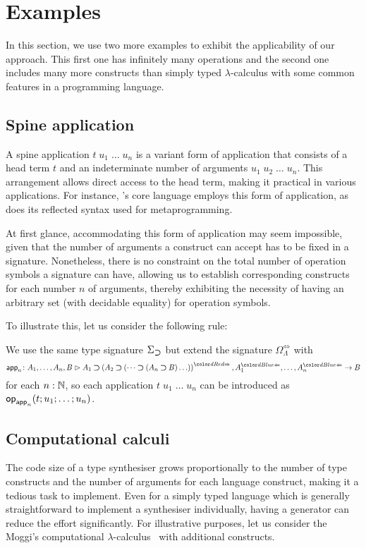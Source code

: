 
\section{Examples}\label{sec:example}
In this section, we use two more examples to exhibit the applicability of our approach.
This first one has infinitely many operations and the second one includes many more constructs than simply typed $\lambda$-calculus with some common features in a programming language.

\subsection{Spine application}\label{subsec:spine}
A spine application $t\;u_1\;\ldots\;u_n$ is a variant form of application that consists of a head term $t$ and an indeterminate number of arguments $u_1\;u_2\;\dots\;u_n$.
This arrangement allows direct access to the head term, making it practical in various applications.
For instance, \Agda's core language employs this form of application, as does its reflected syntax used for metaprogramming.

At first glance, accommodating this form of application may seem impossible, given that the number of arguments a construct can accept has to be fixed in a signature.
Nonetheless, there is no constraint on the total number of operation symbols a signature can have, allowing us to establish corresponding constructs for each number $n$ of arguments, thereby exhibiting the necessity of having an arbitrary set (with decidable equality) for operation symbols.

To illustrate this, let us consider the following rule:
\bgroup
\small
  \begin{mathpar}
  \end{mathpar}
\egroup
We use the same type signature $\Sigma_{\bto}$ but extend the signature $\Omega_{\Lambda}^{\Leftrightarrow}$ with 
\[
  \aritysymbol{\mathsf{app}_n}{A_1,\ldots, A_n, B}{A_1 \bto \left(A_2 \bto \left(\dots \bto \left(A_n \bto B\right)\ldots\right)\right)^{\syn}, A_1^{\chk}, \ldots, A_n^{\chk}}{B}
\]
for each $n : \N$, so each application $t\;u_1\;\ldots\;u_n$ can be introduced as $\tmOp_{\mathsf{app}_n}(t; u_1; \ldots; u_n)$.
\subsection{Computational calculi}\label{subsec:PCF}
The code size of a type synthesiser grows proportionally to the number of type constructs and the number of arguments for each language construct, making it a tedious task to implement.
Even for a simply typed language which is generally straightforward to implement a synthesiser individually, having a generator can reduce the effort significantly.
For illustrative purposes, let us consider the Moggi's computational $\lambda$-calculus~\cite{Moggi1989} with additional constructs.


